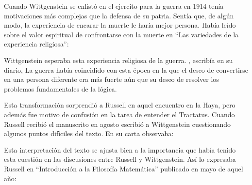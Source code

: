 Cuando Wittgenstein se enlistó en el ejercito para la guerra en 1914 tenía
motivaciones más complejas que la defensa de su patria.\autocite[loc2276]{monk1991duty}
Sentía que, de algún modo, la experiencia de encarar la muerte le haría mejor
persona. Había leído sobre el valor espiritual de confrontarse con la muerte en
``Las variedades de la experiencia religiosa'':

Wittgenstein esperaba esta experiencia religiosa de la guerra.
, escribía en su diario, \autocite[loc2295]{monk1991duty}
La guerra había coincidido con esta época en la que el deseo de convertirse en
una persona diferente era más fuerte aún que su deseo de resolver los problemas
fundamentales de la lógica.\autocite[loc2305]{monk1991duty}

Esta transformación sorprendió a Russell en aquel encuentro en la Haya, pero
además fue motivo de confusión en la tarea de entender el Tractatus. Cuando
Russell recibió el manuscrito en agosto escribió a Wittgenstein cuestionando
algunos puntos difíciles del texto. En su carta observaba: 

Esta interpretación del texto se ajusta bien a la importancia que había tenido
esta cuestión en las discusiones entre Russell y Wittgenstein. Así lo expresaba
Russell en ``Introducción a la Filosofía Matemática'' publicado en mayo de aquel
año: 

